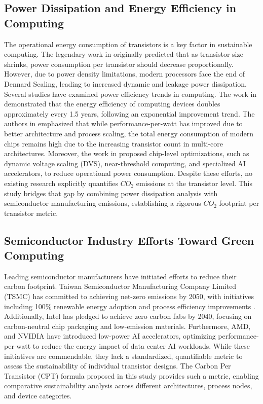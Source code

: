 \subsection{Power Dissipation and Energy Efficiency in Computing}
The operational energy consumption of transistors is a key factor in sustainable computing. The legendary work in \cite{dennard1974design} originally predicted that as transistor size shrinks, power consumption per transistor should decrease proportionally. However, due to power density limitations, modern processors face the end of Dennard Scaling, leading to increased dynamic and leakage power dissipation\cite{horowitz20141}.
Several studies have examined power efficiency trends in computing. The work in\cite{koomey2011growth} demonstrated that the energy efficiency of computing devices doubles approximately every 1.5 years, following an exponential improvement trend. The authors in\cite{hennessy2011computer} emphasized that while performance-per-watt has improved due to better architecture and process scaling, the total energy consumption of modern chips remains high due to the increasing transistor count in multi-core architectures. Moreover, the work in \cite{sungheetha2024adaptive} proposed chip-level optimizations, such as dynamic voltage scaling (DVS), near-threshold computing, and specialized AI accelerators, to reduce operational power consumption. Despite these efforts, no existing research explicitly quantifies $CO_2$ emissions at the transistor level. This study bridges that gap by combining power dissipation analysis with semiconductor manufacturing emissions, establishing a rigorous $CO_2$ footprint per transistor metric.

\subsection{Semiconductor Industry Efforts Toward Green Computing}
Leading semiconductor manufacturers have initiated efforts to reduce their carbon footprint. Taiwan Semiconductor Manufacturing Company Limited (TSMC) has committed to achieving net-zero emissions by 2050, with initiatives including 100\% renewable energy adoption and process efficiency improvements \cite{nagapurkar2023cleaner}. Additionally, Intel has pledged to achieve zero carbon fabs by 2040, focusing on carbon-neutral chip packaging and low-emission materials\cite{ivan2021practices}. Furthermore, AMD, and NVIDIA have introduced low-power AI accelerators, optimizing performance-per-watt to reduce the energy impact of data center AI workloads\cite{kang2024sustainability}. While these initiatives are commendable, they lack a standardized, quantifiable metric to assess the sustainability of individual transistor designs. The Carbon Per Transistor (CPT) formula proposed in this study provides such a metric, enabling comparative sustainability analysis across different architectures, process nodes, and device categories.

